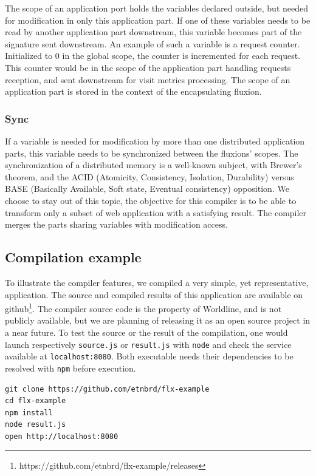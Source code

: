 The scope of an application port holds the variables declared outside, but needed for modification in only this application part.
If one of these variables needs to be read by another application part downstream, this variable becomes part of the signature sent downstream.
An example of such a variable is a request counter. Initialized to 0 in the global scope, the counter is incremented for each request.
This counter would be in the scope of the application part handling requests reception, and sent downstream for visit metrics processing.
The scope of an application part is stored in the context of the encapsulating fluxion.

\subsubsection{Sync}

If a variable is needed for modification by more than one distributed application parts, this variable needs to be synchronized between the fluxions' scopes.
The synchronization of a distributed memory is a well-known subject, with Brewer's theorem\cite{Gilbert2002}\cite{codahale2010}, and the ACID (Atomicity, Consistency, Isolation, Durability) versus BASE (Basically Available, Soft state, Eventual consistency) opposition\cite{Fox1997}.
We choose to stay out of this topic, the objective for this compiler is to be able to transform only a subset of web application with a satisfying result.
The compiler merges the parts sharing variables with modification access.

\subsection{Compilation example}

To illustrate the compiler features, we compiled a very simple, yet representative, application.
The source and compiled results of this application are available on github\cite{flx-example}\footnote{\raggedright https://github.com/etnbrd/flx-example/releases}.
The compiler source code is the property of Worldline, and is not publicly available, but we are planning of releasing it as an open source project in a near future.
To test the source or the result of the compilation, one would launch respectively \texttt{source.js} or \texttt{result.js} with \texttt{node} and check the service available at \texttt{localhost:8080}.
Both executable needs their dependencies to be resolved with \texttt{npm} before execution.
\begin{verbatim}
git clone https://github.com/etnbrd/flx-example
cd flx-example
npm install
node result.js
open http://localhost:8080
\end{verbatim}

